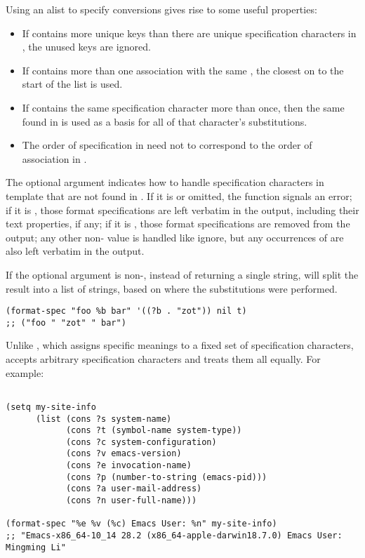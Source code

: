 Using an alist to specify conversions gives rise to some useful properties:
\begin{itemize}
\item If  contains more unique  keys than there are unique specification characters in , the unused keys are ignored.
\item If  contains more than one association with the same , the closest on to the start of the list is used.
\item If  contains the same specification character more than once, then the same  found in  is used as a basis for all of that character's substitutions.
\item The order of specification in  need not to correspond to the order of association in .
\end{itemize}


The optional argument  indicates how to handle specification characters in template that are not found in .
If it is  or omitted, the function signals an error; if it is , those format specifications are left verbatim in the output, including their text properties, if any; if it is , those format specifications are removed from the output; any other non- value is handled like ignore, but any occurrences of \argument{\%\%} are also left verbatim in the output.


If the optional argument  is non-, instead of returning a single string,  will split the result into a list of strings, based on where the substitutions were performed.
\begin{lstlisting}
(format-spec "foo %b bar" '((?b . "zot")) nil t)
;; ("foo " "zot" " bar")
\end{lstlisting}

Unlike , which assigns specific meanings to a fixed set of specification characters,  accepts arbitrary specification characters and treats them all equally. For example:
\begin{lstlisting}

(setq my-site-info
      (list (cons ?s system-name)
            (cons ?t (symbol-name system-type))
            (cons ?c system-configuration)
            (cons ?v emacs-version)
            (cons ?e invocation-name)
            (cons ?p (number-to-string (emacs-pid)))
            (cons ?a user-mail-address)
            (cons ?n user-full-name)))

(format-spec "%e %v (%c) Emacs User: %n" my-site-info)
;; "Emacs-x86_64-10_14 28.2 (x86_64-apple-darwin18.7.0) Emacs User: Mingming Li"
\end{lstlisting}

